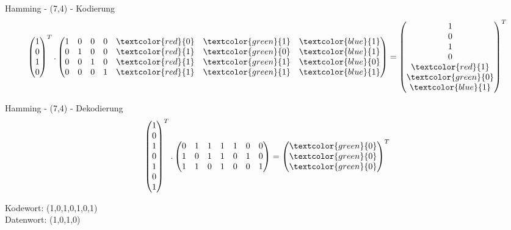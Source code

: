 \documentclass[xcolor=dvipsnames]{beamer}
\begin{document}
\begin{frame}{Hamming - (7,4) - Kodierung}
\[\begin{pmatrix}1\\0\\1\\0\\ \end{pmatrix}^T. \begin{pmatrix}1&0&0&0&\textcolor{red}{0}&\textcolor{green}{1}&\textcolor{blue}{1}\\0&1&0&0&\textcolor{red}{1}&\textcolor{green}{0}&\textcolor{blue}{1}\\0&0&1&0&\textcolor{red}{1}&\textcolor{green}{1}&\textcolor{blue}{0}\\0&0&0&1&\textcolor{red}{1}&\textcolor{green}{1}&\textcolor{blue}{1}\end{pmatrix} = \begin{pmatrix}1\\0\\1\\0\\\textcolor{red}{1}\\\textcolor{green}{0}\\\textcolor{blue}{1}\\ \end{pmatrix}^T\]
\end{frame}

\begin{frame}{Hamming - (7,4) - Dekodierung}
\[\begin{pmatrix}1\\0\\1\\0\\1\\0\\1\\ \end{pmatrix}^T. \begin{pmatrix}0&1&1&1&1&0&0\\1&0&1&1&0&1&0\\1&1&0&1&0&0&1\end{pmatrix} = \begin{pmatrix}\textcolor{green}{0}\\\textcolor{green}{0}\\\textcolor{green}{0}\\ \end{pmatrix}^T\]

Kodewort: (1,0,1,0,1,0,1)\\
Datenwort: (1,0,1,0)
\end{frame}
\end{document}
